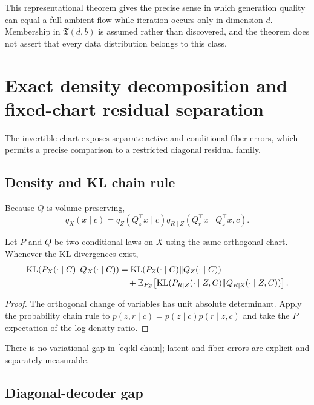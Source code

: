 This representational theorem gives the precise sense in which generation quality can equal a full ambient flow while iteration occurs only in dimension $d$.  Membership in $\mathfrak T(d,b)$ is assumed rather than discovered, and the theorem does not assert that every data distribution belongs to this class.

\section{Exact density decomposition and fixed-chart residual separation}

The invertible chart exposes separate active and conditional-fiber errors, which permits a precise comparison to a restricted diagonal residual family.

\subsection{Density and KL chain rule}

Because $Q$ is volume preserving,
\begin{equation}
 q_X(x\mid c)=q_Z(Q_z^\top x\mid c)
 q_{R\mid Z}(Q_r^\top x\mid Q_z^\top x,c).
 \label{eq:density-factor}
\end{equation}

\begin{theorem}
Let $P$ and $Q$ be two conditional laws on $X$ using the same orthogonal chart.  Whenever the KL divergences exist,
\begin{align}
 \operatorname{KL}(P_X(\cdot\mid C)\|Q_X(\cdot\mid C))
 &=\operatorname{KL}(P_Z(\cdot\mid C)\|Q_Z(\cdot\mid C))\nonumber\\
 &\quad+\mathbb E_{P_Z}\!\left[
 \operatorname{KL}(P_{R\mid Z}(\cdot\mid Z,C)\|Q_{R\mid Z}(\cdot\mid Z,C))
 \right].
 \label{eq:kl-chain}
\end{align}
\end{theorem}
\begin{proof}
The orthogonal change of variables has unit absolute determinant.  Apply the probability chain rule to $p(z,r\mid c)=p(z\mid c)p(r\mid z,c)$ and take the $P$ expectation of the log density ratio.
\end{proof}

There is no variational gap in \eqref{eq:kl-chain}; latent and fiber errors are explicit and separately measurable.

\subsection{Diagonal-decoder gap}

